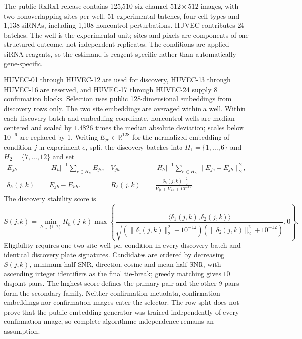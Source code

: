 \documentclass[11pt]{article}
\theoremstyle{plain}
\theoremstyle{definition}
\numberwithin{equation}{section}
\newcommand{\R}{\mathbb R}
\newcommand{\1}{\mathbf 1}
\providecommand{\RxConfirmationBatches}{8}
\providecommand{\RxSelectedPairs}{10}
\providecommand{\RxReplicationPairs}{9}
\begin{document}
The public RxRx1 release \citep{Recursion2023,Sypetkowski2023} contains 125,510 six-channel $512\times512$ images, with two nonoverlapping sites per well, 51 experimental batches, four cell types and 1,138 siRNAs, including 1,108 noncontrol perturbations. HUVEC contributes 24 batches. The well is the experimental unit; sites and pixels are components of one structured outcome, not independent replicates. The conditions are applied siRNA reagents, so the estimand is reagent-specific rather than automatically gene-specific.

HUVEC-01 through HUVEC-12 are used for discovery, HUVEC-13 through HUVEC-16
are reserved, and HUVEC-17 through HUVEC-24 supply
$\RxConfirmationBatches$ confirmation blocks. Selection uses public
128-dimensional embeddings from discovery rows only. The two site embeddings
are averaged within a well. Within each discovery batch and embedding
coordinate, noncontrol wells are median-centered and scaled by $1.4826$ times
the median absolute deviation; scales below $10^{-6}$ are replaced by 1.
Writing $E_{je}\in\R^{128}$ for the normalized embedding of condition $j$ in
experiment $e$, split the discovery batches into
$H_1=\{1,\ldots,6\}$ and $H_2=\{7,\ldots,12\}$ and set
\[
\begin{aligned}
\bar E_{jh}&=|H_h|^{-1}\sum_{e\in H_h}E_{je},&
V_{jh}&=|H_h|^{-1}\sum_{e\in H_h}\|E_{je}-\bar E_{jh}\|_2^2,\\
\delta_h(j,k)&=\bar E_{jh}-\bar E_{kh},&
R_h(j,k)&=\frac{\|\delta_h(j,k)\|_2^2}
{V_{jh}+V_{kh}+10^{-12}}.
\end{aligned}
\]
The discovery stability score is
\begin{equation}\label{eq:selection-score}
S(j,k)=
\min_{h\in\{1,2\}}R_h(j,k)
\max\left\{
\frac{\langle\delta_1(j,k),\delta_2(j,k)\rangle}
{\sqrt{(\|\delta_1(j,k)\|_2^2+10^{-12})
(\|\delta_2(j,k)\|_2^2+10^{-12})}},0\right\}.
\end{equation}
Eligibility requires one two-site well per condition in every discovery batch
and identical discovery plate signatures. Candidates are ordered by decreasing
$S(j,k)$, minimum half-SNR, direction cosine and mean half-SNR, with ascending
integer identifiers as the final tie-break; greedy matching gives
$\RxSelectedPairs$ disjoint pairs. The highest score defines the primary pair
and the other $\RxReplicationPairs$ pairs form the secondary family. Neither
confirmation metadata, confirmation embeddings nor confirmation images enter
the selector. The row split does not prove that the public embedding generator
was trained independently of every confirmation image, so complete algorithmic
independence remains an assumption.
\end{document}
